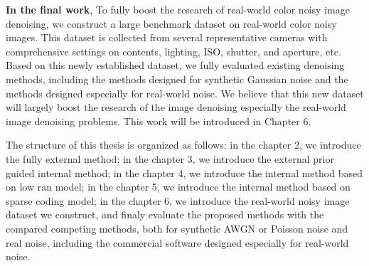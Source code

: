 \textbf{In the final work}, To fully boost the research of real-world color noisy image denoising, we construct a large benchmark dataset on real-world color noisy images. This dataset is collected from several representative cameras with comprehensive settings on contents, lighting, ISO, shutter, and aperture, etc. Based on this newly established dataset, we fully evaluated existing denoising methods, including the methods designed for synthetic Gaussian noise and the methods designed especially for real-world noise. We believe that this new dataset will largely boost the research of the image denoising especially the real-world image denoising problems. This work will be introduced in Chapter 6.


The structure of this thesis is organized as follows: in the chapter 2, we introduce the fully external method; in the chapter 3, we introduce the external prior guided internal method; in the chapter 4, we introduce the internal method based on low ran model; in the chapter 5, we introduce the internal method based on sparse coding model; in the chapter 6, we introduce the real-world noisy image dataset we construct, and finaly evaluate the proposed methods with the compared competing methods, both for synthetic AWGN or Poisson noise and real noise, including the commercial software designed especially for real-world noise. 






